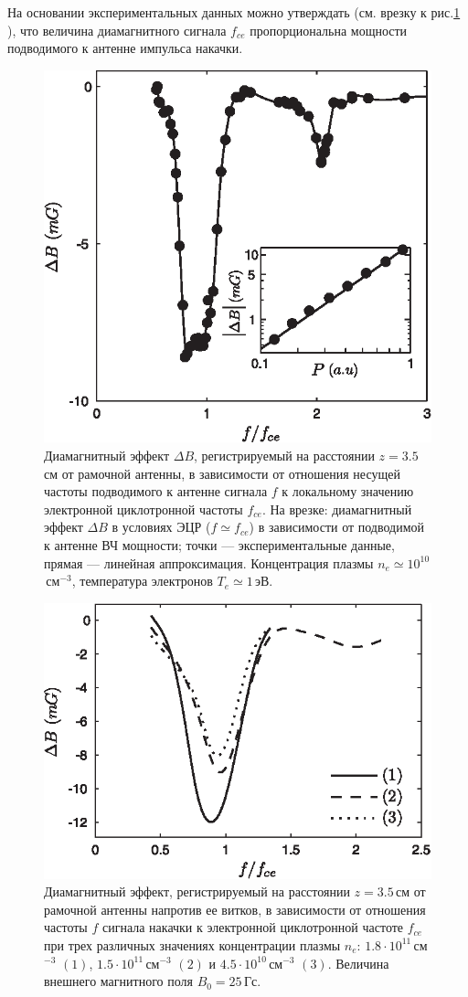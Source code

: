 \documentclass[autoref,10pt]{disser}
\begin{document}
На основании экспериментальных данных можно утверждать (см. врезку к \mbox{рис.\ref{fig:cycl_line}} ), что величина диамагнитного сигнала $f_{ce}$ пропорциональна мощности подводимого к антенне импульса накачки. 
\begin{figure}[H]
    \centering
    \includegraphics*[width=0.6\columnwidth]{pics/fig1.eps}
    \caption{Диамагнитный эффект $\Delta{}B$, регистрируемый на расстоянии $z=3.5$\,см от рамочной антенны, в зависимости от отношения несущей частоты подводимого к антенне сигнала $f$ к локальному значению электронной циклотронной частоты $f_{ce}$. На врезке: диамагнитный эффект $\Delta{}B$ в условиях ЭЦР ($f\simeq f_{ce}$) в зависимости от подводимой к антенне ВЧ мощности; точки --- экспериментальные данные, прямая --- линейная аппроксимация. Концентрация плазмы $n_{e}\simeq 10^{10}$\,см$^{-3}$, температура электронов $T_e\simeq 1$\,эВ.}
    \label{fig:cycl_line}
\end{figure}

\begin{figure}[H]
    \centering
    \includegraphics*[width=0.7\linewidth]{pics/cyclotrone_lines.eps}
    \caption{Диамагнитный эффект, регистрируемый на расстоянии $z=3.5$\,см от рамочной антенны напротив ее витков, в зависимости от отношения частоты $f$ сигнала накачки к электронной циклотронной частоте $f_{ce}$ при трех различных значениях концентрации плазмы $n_{e}$: $1.8\cdot{}10^{11}$\,см$^{-3}$ $(1)$, $1.5\cdot{}10^{11}$\,см$^{-3}$ $(2)$ и $4.5\cdot{}10^{10}$\,см$^{-3}$ $(3)$. Величина внешнего магнитного поля $B_{0}=25$\,Гс.}
    \label{fig:cyclotrone_lines}
\end{figure}
\end{document}

